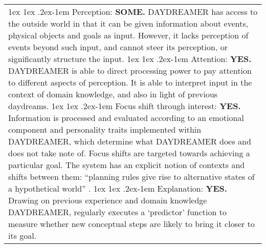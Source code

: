 \let\oldparagraph\paragraph
\makeatletter
\renewcommand{\paragraph}{%
  \@startsection{paragraph}{4}%
  {\z@}{1ex \@plus 1ex \@minus .2ex}{-1em}%
  {\normalfont\normalsize\itshape}%
}
\makeatother

\begin{table}
\begin{mdframed}[innertopmargin=-10pt]
\begin{tabular}{p{}}
\paragraph{Perception:}
\textbf{SOME.} {\sf DAYDREAMER} has access to the outside world in that it
can be given information about events, physical objects and goals as
input. However, it lacks perception of events beyond such input,
and cannot steer its perception, or significantly structure the input.
\paragraph{Attention:}
\textbf{YES.} {\sf DAYDREAMER} is able to direct processing
power to pay attention to different aspects of perception.  It is able
to interpret input in the context of domain knowledge, and also in
light of previous daydreams.
\paragraph{Focus shift through interest:}
\textbf{YES.} Information is processed and evaluated according to an
emotional component and personality traits implemented within
{\sf DAYDREAMER}, which determine what {\sf DAYDREAMER} does and
does not take note of.  Focus shifts are targeted towards achieving
a particular goal.  The system has an explicit notion of contexts and shifts between them:
``planning rules give rise to alternative states of a hypothetical world''
\cite[p.~35]{mueller1990}.
\paragraph{Explanation:}
\textbf{YES.}  Drawing on previous experience and domain knowledge
       {\sf DAYDREAMER}, regularly executes a `predictor' function to
       measure whether new conceptual steps are likely to bring it
       closer to its goal.

\end{tabular}
\end{mdframed}
\end{table}
